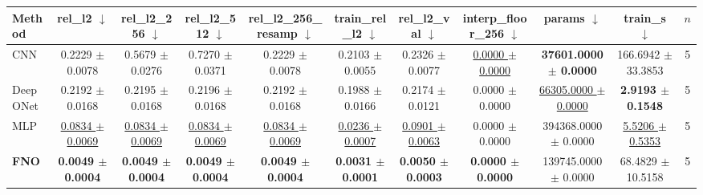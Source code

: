 \begin{tabular}{lcccccccccc}
\toprule
Method & rel\_l2 $\downarrow$ & rel\_l2\_256 $\downarrow$ & rel\_l2\_512 $\downarrow$ & rel\_l2\_256\_resamp $\downarrow$ & train\_rel\_l2 $\downarrow$ & rel\_l2\_val $\downarrow$ & interp\_floor\_256 $\downarrow$ & params $\downarrow$ & train\_s $\downarrow$ & $n$ \\
\midrule
CNN & 0.2229 $\pm$ 0.0078 & 0.5679 $\pm$ 0.0276 & 0.7270 $\pm$ 0.0371 & 0.2229 $\pm$ 0.0078 & 0.2103 $\pm$ 0.0055 & 0.2326 $\pm$ 0.0077 & \underline{0.0000 $\pm$ 0.0000} & \textbf{37601.0000 $\pm$ 0.0000} & 166.6942 $\pm$ 33.3853 & 5 \\
DeepONet & 0.2192 $\pm$ 0.0168 & 0.2195 $\pm$ 0.0168 & 0.2196 $\pm$ 0.0168 & 0.2192 $\pm$ 0.0168 & 0.1988 $\pm$ 0.0166 & 0.2174 $\pm$ 0.0121 & 0.0000 $\pm$ 0.0000 & \underline{66305.0000 $\pm$ 0.0000} & \textbf{2.9193 $\pm$ 0.1548} & 5 \\
MLP & \underline{0.0834 $\pm$ 0.0069} & \underline{0.0834 $\pm$ 0.0069} & \underline{0.0834 $\pm$ 0.0069} & \underline{0.0834 $\pm$ 0.0069} & \underline{0.0236 $\pm$ 0.0007} & \underline{0.0901 $\pm$ 0.0063} & 0.0000 $\pm$ 0.0000 & 394368.0000 $\pm$ 0.0000 & \underline{5.5206 $\pm$ 0.5353} & 5 \\
\textbf{FNO} & \textbf{0.0049 $\pm$ 0.0004} & \textbf{0.0049 $\pm$ 0.0004} & \textbf{0.0049 $\pm$ 0.0004} & \textbf{0.0049 $\pm$ 0.0004} & \textbf{0.0031 $\pm$ 0.0001} & \textbf{0.0050 $\pm$ 0.0003} & \textbf{0.0000 $\pm$ 0.0000} & 139745.0000 $\pm$ 0.0000 & 68.4829 $\pm$ 10.5158 & 5 \\
\bottomrule
\end{tabular}
